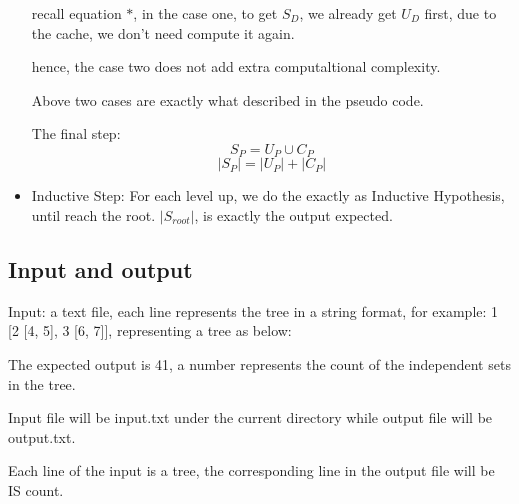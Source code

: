 \documentclass{article}
\begin{document}
\begin{itemize}
    recall equation $*$, in the case one, to get $S_{D}$, we already get $U_{D}$ first, due to the cache, we don't need compute it again. 

    hence, the case two does not add extra computaltional complexity.

    Above two cases are exactly what described in the pseudo code.
    
    The final step:
    \[ S_{P} =  U_{P} \cup C_{P} \] 
    \[ |S_{P}| =  |U_{P}| + |C_{P}| \] 



  \item Inductive Step: For each level up, we do the exactly as Inductive Hypothesis, until reach the root. $|S_{root}|$, is exactly the output expected.

  \end{itemize}


\subsection*{Input and output}
Input: a text file, each line represents the tree in a string format, for example: 1 [2 [4, 5], 3 [6, 7]], representing a tree as below:



The expected output is 41, a number represents the count of the independent sets in the tree. 

Input file will be input.txt under the current directory while output file will be output.txt.

Each line of the input is a tree, the corresponding line in the output file will be IS count.
\end{document}
